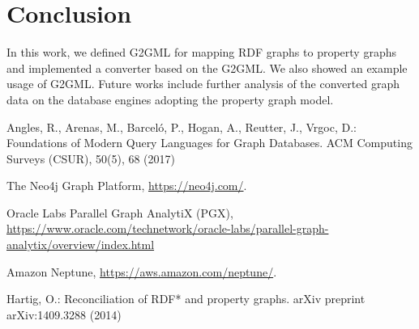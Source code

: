 \documentclass[runningheads]{llncs}
\begin{document}
\section{Conclusion}
In this work, we defined G2GML for mapping RDF graphs to property graphs and implemented a converter based on the G2GML. We also showed an example usage of G2GML. Future works include further analysis of the converted graph data on the database engines adopting the property graph model.


%
%
%
% 
% 
%
\begin{thebibliography}{8}

Angles, R., Arenas, M., Barceló, P., Hogan, A., Reutter, J., Vrgoc, D.: Foundations of Modern Query Languages for Graph Databases. ACM Computing Surveys (CSUR), 50(5), 68 (2017)

The Neo4j Graph Platform, \url{https://neo4j.com/}.

Oracle Labs Parallel Graph AnalytiX (PGX), \url{https://www.oracle.com/technetwork/oracle-labs/parallel-graph-analytix/overview/index.html}

Amazon Neptune, \url{https://aws.amazon.com/neptune/}.

Hartig, O.: Reconciliation of RDF* and property graphs. arXiv preprint arXiv:1409.3288 (2014)





\end{thebibliography}
\end{document}
